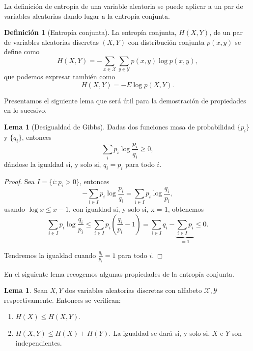 \documentclass[10pt,a4paper]{article} %
\theoremstyle{definition}
\newtheorem{definition}{Definición}[section]
\newtheorem{lemma}[theorem]{Lema}
\begin{document}
La definición de entropía de una variable aleatoria se puede aplicar a un par de variables aleatorias dando lugar a la entropía conjunta.

\begin{definition}[Entropía conjunta]
  La entropía conjunta, $H(X,Y)$, de un par de variables aleatorias discretas $(X,Y)$ con distribución conjunta $p(x,y)$ se define como \[
  H(X,Y) = - \sum_{x \in \mathcal{X}} \sum_{y \in \mathcal{Y}} p(x,y) \log p(x,y), \]
  que podemos expresar también como \[
  H(X,Y) = - E \log p(X,Y).\]
\end{definition}
Presentamos el siguiente lema que será útil para la demostración de propiedades en lo sucesivo.

\begin{lemma}[Desigualdad de Gibbs]\label{l:gibbs}
  Dadas dos funciones masa de probabilidad $\{p_i\}$ y $\{q_i\}$, entonces \[
\sum_i p_i \log \frac{p_i}{q_i} \ge 0,
\]
dándose la igualdad si, y solo si, $q_i = p_i$ para todo $i$.
\end{lemma}

\begin{proof}
  Sea $I = \{i : p_i > 0\}$, entonces\[
- \sum_{i \in I} p_i \log \frac{p_i}{q_i} = \sum_{i \in I} p_i \log \frac{q_i}{p_i},
  \]
  usando $\log x \le x - 1$, con igualdad si, y solo si, x = 1, obtenemos\[
  \sum_{i \in I} p_i \log \frac{q_i}{p_i} \leq
  \sum_{i\in I}p_i \left ( \frac{q_i}{p_i} - 1 \right )
  = \sum_{i\in I}q_i - \underbrace{\sum_{i \in I}p_i}_{= 1} \leq 0.\]

  Tendremos la igualdad cuando $\frac{q_i}{p_i} = 1$ para todo $i$.
\end{proof}

En el siguiente lema recogemos algunas propiedades de la entropía conjunta.

\begin{lemma}\label{l:prop_ent_conj} Sean $X, Y$ dos variables aleatorias discretas con alfabeto $\mathcal{X}, \mathcal{Y}$ respectivamente. Entonces se verifican:
  \begin{enumerate}
  \item $H(X) \le H(X, Y)$.
  \item $H(X,Y) \le H(X) + H(Y)$. La igualdad se dará si, y solo si, $X$ e $Y$ son independientes.
  \end{enumerate}
\end{lemma}
\end{document}
